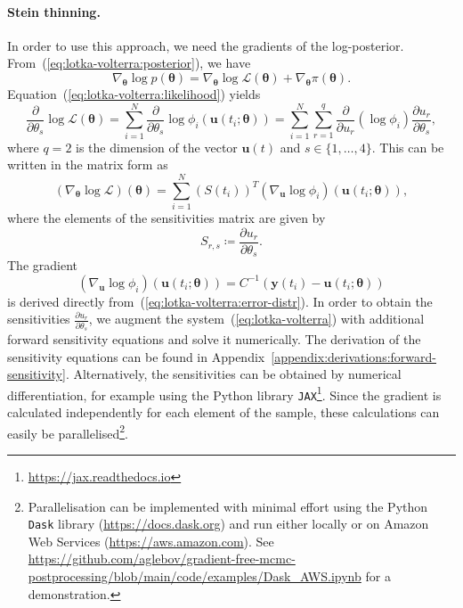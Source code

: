 \documentclass[11pt,a4paper]{report}
\begin{document}
\paragraph{Stein thinning.} In order to use this approach, we need the gradients of the log-posterior. From~(\ref{eq:lotka-volterra:posterior}), we have
\begin{equation*}
\nabla_{\pmb{\theta}} \log p(\pmb{\theta}) = \nabla_{\pmb{\theta}} \log \mathcal{L}(\pmb{\theta}) + \nabla_{\pmb{\theta}} \pi(\pmb{\theta}).
\end{equation*}
Equation~(\ref{eq:lotka-volterra:likelihood}) yields
\begin{equation*}
\frac{\partial}{\partial \theta_s} \log \mathcal{L}(\pmb{\theta}) 
= \sum_{i=1}^N \frac{\partial}{\partial \theta_s} \log \phi_i(\mathbf{u}(t_i; \pmb{\theta}))
= \sum_{i=1}^N \sum_{r=1}^q \frac{\partial}{\partial u_r} (\log \phi_i) \frac{\partial u_r}{\partial \theta_s},
\end{equation*}
where $q = 2$ is the dimension of the vector $\mathbf{u}(t)$ and $s \in \{1, \dots, 4\}$. This can be written in the matrix form as
\begin{equation*}
(\nabla_{\pmb{\theta}} \log \mathcal{L})(\pmb{\theta}) = \sum_{i=1}^N (S(t_i))^T (\nabla_{\mathbf{u}} \log \phi_i)(\mathbf{u}(t_i; \pmb{\theta})),
\end{equation*}
where the elements of the sensitivities matrix are given by
\begin{equation*}
S_{r,s} \coloneq \frac{\partial u_r}{\partial \theta_s}.
\end{equation*}
The gradient
\begin{equation*}
(\nabla_\mathbf{u} \log \phi_i)(\mathbf{u}(t_i; \pmb{\theta})) = C^{-1}(\mathbf{y}(t_i) - \mathbf{u}(t_i; \pmb{\theta}))
\end{equation*}
is derived directly from~(\ref{eq:lotka-volterra:error-distr}). In order to obtain the sensitivities $\frac{\partial u_r}{\partial \theta_s}$, we augment the system~(\ref{eq:lotka-volterra}) with additional forward sensitivity equations and solve it numerically. The derivation of the sensitivity equations can be found in Appendix~\ref{appendix:derivations:forward-sensitivity}. Alternatively, the sensitivities can be obtained by numerical differentiation, for example using the Python library \texttt{JAX}\footnote{\url{https://jax.readthedocs.io}}. Since the gradient is calculated independently for each element of the sample, these calculations can easily be parallelised\footnote{Parallelisation can be implemented with minimal effort using the Python \texttt{Dask} library (\url{https://docs.dask.org}) and run either locally or on Amazon Web Services (\url{https://aws.amazon.com}). See \url{https://github.com/aglebov/gradient-free-mcmc-postprocessing/blob/main/code/examples/Dask_AWS.ipynb} for a demonstration.}.
\end{document}

